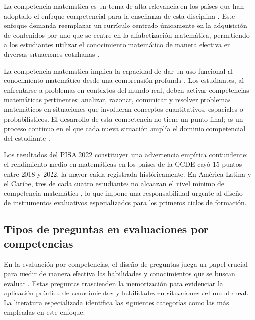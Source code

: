 La competencia matemática es un tema de alta relevancia en los países que han adoptado el enfoque competencial para la enseñanza de esta disciplina \cite{maskos2025fa,oecd2023pisa}. Este enfoque demanda reemplazar un currículo centrado únicamente en la adquisición de contenidos por uno que se centre en la alfabetización matemática, permitiendo a los estudiantes utilizar el conocimiento matemático de manera efectiva en diversas situaciones cotidianas \cite{oecd2023pisa}.

La competencia matemática implica la capacidad de dar un uso funcional al conocimiento matemático desde una comprensión profunda \cite{oecd2019compass}. Los estudiantes, al enfrentarse a problemas en contextos del mundo real, deben activar competencias matemáticas pertinentes: analizar, razonar, comunicar y resolver problemas matemáticos en situaciones que involucran conceptos cuantitativos, espaciales o probabilísticos. El desarrollo de esta competencia no tiene un punto final; es un proceso continuo en el que cada nueva situación amplía el dominio competencial del estudiante \cite{maskos2025fa}.

Los resultados del PISA 2022 \cite{oecd2023pisa} constituyen una advertencia empírica contundente: el rendimiento medio en matemáticas en los países de la OCDE cayó 15 puntos entre 2018 y 2022, la mayor caída registrada históricamente. En América Latina y el Caribe, tres de cada cuatro estudiantes no alcanzan el nivel mínimo de competencia matemática \cite{bid2023pisa,unesco2024lac}, lo que impone una responsabilidad urgente al diseño de instrumentos evaluativos especializados para los primeros ciclos de formación.

\subsection{Tipos de preguntas en evaluaciones por competencias}

En la evaluación por competencias, el diseño de preguntas juega un papel crucial para medir de manera efectiva las habilidades y conocimientos que se buscan evaluar \cite{evans2020cbe}. Estas preguntas trascienden la memorización para evidenciar la aplicación práctica de conocimientos y habilidades en situaciones del mundo real. La literatura especializada identifica las siguientes categorías como las más empleadas en este enfoque:

